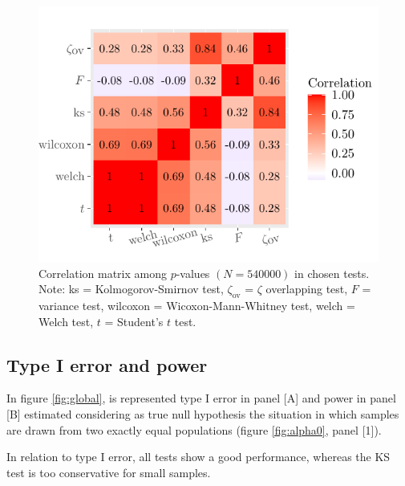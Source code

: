 \documentclass[twocolumn]{article}\usepackage[]{graphicx}\usepackage[]{xcolor}
\makeatletter
\def\maxwidth{ %
  \ifdim\Gin@nat@width>\linewidth
    \linewidth
  \else
    \Gin@nat@width
  \fi
}
\newenvironment{knitrout}{}{} %
\makeatother
\begin{document}
\begin{knitrout}
\color{fgcolor}\begin{figure}[!t]

{\centering \includegraphics[width=\maxwidth]{figure/correlazioni-1} 

}

\caption[Correlation matrix among $p$-values $(N = 540000)$ in chosen tests]{Correlation matrix among $p$-values $(N = 540000)$ in chosen tests. Note: ks = Kolmogorov-Smirnov test, $\zeta_{\mbox{ov}}$ = $\zeta$  overlapping test, $F$ = variance test, wilcoxon = Wicoxon-Mann-Whitney test, welch = Welch test, $t$ = Student's $t$ test.}\label{fig:correlazioni}
\end{figure}

\end{knitrout}




\subsection{Type I error and power}





In figure \ref{fig:global}, is represented type I error in panel [A] and power in panel [B] estimated considering as true null hypothesis the situation in which samples are drawn from two exactly equal populations (figure \ref{fig:alpha0}, panel [1]).

In relation to type I error, all tests show a good performance, whereas the KS test is too conservative for small samples. 
\end{document}
